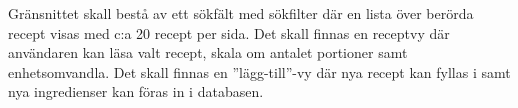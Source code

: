 Gränsnittet skall bestå av ett sökfält med sökfilter där en lista över berörda recept visas med c:a 20 recept per sida. Det skall finnas en receptvy där användaren kan läsa valt recept, skala om antalet portioner samt enhetsomvandla. Det skall finnas en ”lägg-till”-vy där nya recept kan fyllas i samt nya ingredienser kan föras in i databasen.
